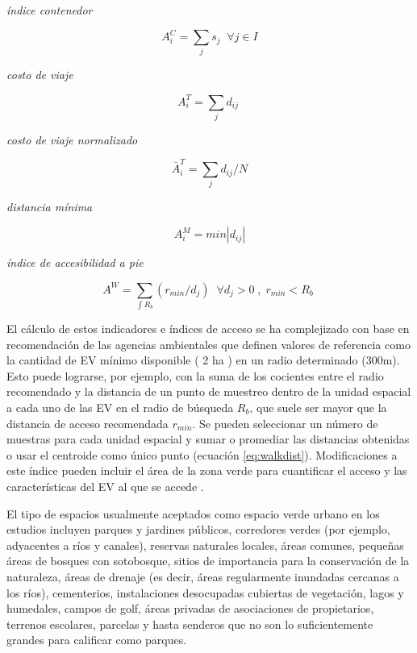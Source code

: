 \documentclass[12pt,]{book}
\begin{document}
\emph{índice contenedor}

\begin{equation}
A^{C}_i =\sum_j{s_j} \;  \; \forall  j \in I
\label{eq:contenedor}
\end{equation}

\emph{costo de viaje}

\begin{equation}
A^{T}_i =\sum_j{d_{ij}} \; 
\label{eq:costoviaje}
\end{equation}

\emph{costo de viaje normalizado}

\begin{equation}
\bar{A}^{T}_i =\sum_j{d_{ij}/N}
\label{eq:ncosto}
\end{equation}

\emph{distancia mínima}

\begin{equation}
A^{M}_i=min\left | d_{ij} \right | 
\label{eq:mindist}
\end{equation}

\emph{índice de accesibilidad a pie}

\begin{equation}
A^{W}= \sum_{\int R_b }{(r_{min}/d_j)}  \;  \; \forall  d_j>0 \; , \; r_{min}<R_b  \;
\label{eq:walkdist}
\end{equation}

El cálculo de estos indicadores e índices de acceso se ha complejizado
con base en recomendación de las agencias ambientales que definen
valores de referencia como la cantidad de EV mínimo disponible ( 2 ha )
en un radio determinado (300m). Esto puede lograrse, por ejemplo, con la
suma de los cocientes entre el radio recomendado y la distancia de un
punto de muestreo dentro de la unidad espacial a cada uno de las EV en
el radio de búsqueda \(R_b\), que suele ser mayor que la distancia de
acceso recomendada \(r_{min}\). Se pueden seleccionar un número de
muestras para cada unidad espacial y sumar o promediar las distancias
obtenidas \citep{zhou_social_2013} o usar el centroide como único punto
(ecuación \eqref{eq:walkdist}). Modificaciones a este índice pueden
incluir el área de la zona verde para cuantificar el acceso y las
características del EV al que se accede \citep{comber_using_2008}.

El tipo de espacios usualmente aceptados como espacio verde urbano en
los estudios incluyen parques y jardines públicos, corredores verdes
(por ejemplo, adyacentes a ríos y canales), reservas naturales locales,
áreas comunes, pequeñas áreas de bosques con sotobosque, sitios de
importancia para la conservación de la naturaleza, áreas de drenaje (es
decir, áreas regularmente inundadas cercanas a los ríos), cementerios,
instalaciones desocupadas cubiertas de vegetación, lagos y humedales,
campos de golf, áreas privadas de asociaciones de propietarios, terrenos
escolares, parcelas y hasta senderos que no son lo suficientemente
grandes para calificar como
parques\citep{nesbitt_exploring_2016, comber_using_2008, kabisch_green_2014, zhou_social_2013}.
\end{document}
